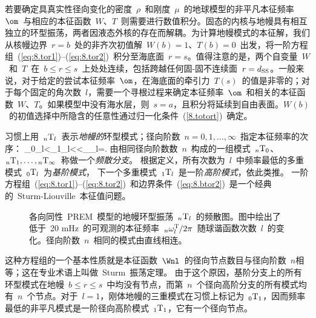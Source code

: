 若要确定具真实性径向变化的密度~$\rho$~和刚度~$\mu$~的地球模型的非平凡本征频率~$\om$~与相应的本征函数~$W$、$T$~则需要进行数值积分。固态的内核与地幔具有相互独立的环型振荡，两者因液态外核的存在而解耦。为计算地幔模式的本征解，我们从核幔边界~$r=b$~处的非齐次初值解~$W(b)=1$、$T(b)=0$~出发，将一阶方程组~(\ref{eq:8.tor1})--(\ref{eq:8.tor2})~积分至海底面~$r=s$。值得注意的是，两个自变量~$W$~和~$T$~在~$b\leq r\leq s$~上处处连续，包括跨越任何固-固不连续面~$r=d_{\rm SS}$。一般来说，对于给定的尝试本征频率~$\om$，在海底面的牵引力~$T(s)$~的值是非零的；对于每个固定的角次数~$l$，需要一个寻根过程来确定本征频率~$\om$~和相关的本征函数~$W$、$T$。如果模型中没有海水层，则~$s=a$，且积分将延续到自由表面。$W(b)$~的初值选择中所隐含的任意性通过归一化条件~(\ref{8.totort})~确定。

习惯上用~${}_n{\rm T}_l$~表示{\em 地幔的\/}环型模式；径向阶数~$n=0,1,\ldots,\infty$~指定本征频率的次序：
\eq \label{8.eiforder}
{}_0\om_l<{}_1\om_l<\cdots<{}_{\infty}\om_l=\infty.
\en
由相同径向阶数数~$n$~构成的一组模式~${}_n{\rm T}_0$、${}_n{\rm T}_1,\ldots,{}_n{\rm T}_{\infty}$~称做一个{\em 频散分支\/}。
%
根据定义，所有次数为~$l$~中频率最低的多重模式~${}_0{\rm T}_l$~为{\em 基阶模式\/}，
%
%
下一个多重模式~${}_1{\rm T}_l$~是一阶{\em 高阶模式\/}，依此类推。
%
一阶方程组~(\ref{eq:8.tor1})--(\ref{eq:8.tor2})~和边界条件~(\ref{eq:8.btor2})~是一个经典的~Sturm-Liouville~本征值问题。
%
\begin{figure}[!b]
\begin{center}
\end{center}
\caption[tormodefreqs]{\label{fig:tormodefreqs}
各向同性~PREM~模型的地幔环型振荡~${}_n{\rm T}_l$~的频散图。图中绘出了低于~20 mHz~的可观测的本征频率~${}_n\omega_l^{\rm T}\hspace{-0.2 mm}/2\pi$~随球谐函数次数~$l$~的变化。径向阶数~$n$~相同的模式由直线相连。
}
\end{figure}
这种方程组的一个基本性质就是本征函数~$\Wnl$~的径向节点数目与径向阶数~$n$相等；这在专业术语上叫做~Sturm~振荡定理。
%
由于这个原因，基阶分支上的所有环型模式在地幔~$b\leq r\leq s$~中均没有节点，而第~$n$~个径向高阶分支的所有模式均有~$n$~个节点。对于~$l=1$，刚体地幔的三重模式在习惯上标记为~${}_0{\rm T}_1$，因而频率最低的非平凡模式是一阶径向高阶模式~${}_1{\rm T}_1$，它有一个径向节点。

